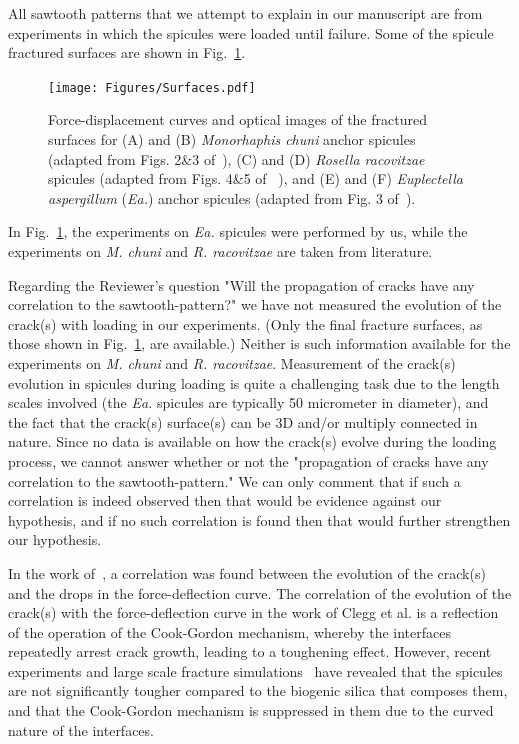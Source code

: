 \documentclass[11pt,letterpaper]{report}
\begin{document}
\begin{enumerate}[label=\textit{1.\arabic*},wide, labelwidth=!, labelindent=0pt]
\begin{enumerate}[label=\textit{2.\arabic*},wide, labelindent=0pt]
All  sawtooth patterns that we attempt to explain in our manuscript are from experiments in which the spicules were loaded until failure. Some of the spicule
 fractured surfaces are shown in Fig.~\ref{fig:Surfaces}.

\begin{figure}[H]
\centering
\texttt{[image: Figures/Surfaces.pdf]}
\caption{Force-displacement curves and optical images of the fractured surfaces for (A) and (B) \textit{Monorhaphis chuni} anchor spicules (adapted from Figs. 2\&3 of~\cite{levi1989remarkably}), (C) and (D) \textit{Rosella racovitzae} spicules (adapted from Figs. 4\&5 of ~\cite{sarikaya2001biomimetic}), and (E) and (F) \textit{Euplectella aspergillum} (\textit{Ea.}) anchor spicules (adapted from Fig. 3 of~\citet{monn2017enhanced}).
}
\label{fig:Surfaces}
\end{figure}


In Fig.~\ref{fig:Surfaces}, the experiments on \textit{Ea.} spicules were performed by us, while the experiments on \textit{M. chuni} and \textit{R. racovitzae} are taken from literature.


Regarding the Reviewer's question "Will the propagation of cracks have any correlation to the sawtooth-pattern?" we have not measured the evolution of the crack(s) with loading in our experiments. (Only the final fracture surfaces, as those shown in Fig.~\ref{fig:Surfaces}, are available.) Neither is such information available for the experiments on \textit{M. chuni} and \textit{R. racovitzae}. Measurement of the crack(s) evolution in spicules during loading is quite a challenging task due to the length scales involved (the \textit{Ea.} spicules are typically 50 micrometer in diameter), and the fact that the crack(s) surface(s) can be 3D and/or multiply connected in nature. Since no data is available on how the crack(s) evolve during the loading process, we cannot answer whether or not the "propagation of cracks have any correlation to the sawtooth-pattern." We can only comment that if such a correlation is indeed observed then that would be evidence against our hypothesis, and if no such correlation is found then that would further strengthen our hypothesis.

In the work of~\citet{clegg1990simple}, a correlation was found between the evolution of the crack(s) and the drops in the force-deflection curve. The correlation of the evolution of the crack(s) with the force-deflection curve in the work of Clegg et al. is a reflection of the operation of the Cook-Gordon mechanism, whereby the interfaces repeatedly arrest crack growth, leading to a toughening effect. However, recent experiments and large scale fracture simulations~\citep{monn2020lamellar} have revealed that the spicules are not significantly tougher compared to the biogenic silica that composes them, and that the Cook-Gordon mechanism is suppressed in them due to the curved nature of the interfaces.


\end{enumerate}
\end{enumerate}
\end{document}
